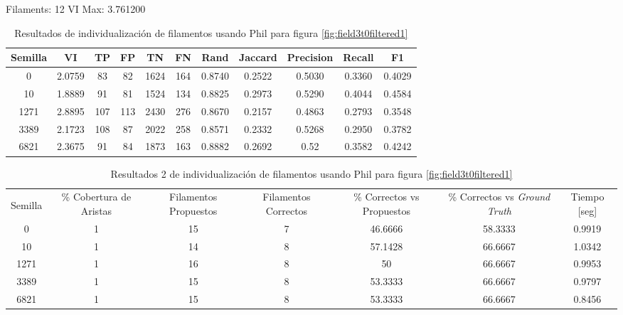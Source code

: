 Filaments: 12	VI Max: 3.761200
\begin{table}[h]
    \centering
    \begin{tabular}{|c|c|c|c|c|c|c|c|c|c|c|}
    \hline
        Semilla & VI & TP & FP &TN &FN & Rand	& Jaccard &	Precision &	Recall &	F1 \\ \hline 
        0    & 2.0759 & 83  & 82  & 1624 & 164 & 0.8740  & 0.2522  & 0.5030  & 0.3360 & 0.4029 \\
        10   & 1.8889  & 91  & 81  & 1524 & 134 & 0.8825 & 0.2973 & 0.5290  & 0.4044 & 0.4584 \\
        1271 & 2.8895 & 107 & 113 & 2430 & 276 & 0.8670 & 0.2157 & 0.4863 & 0.2793 & 0.3548\\
        3389 & 2.1723 & 108 & 87  & 2022 & 258 & 0.8571 & 0.2332 & 0.5268 & 0.2950 & 0.3782\\
        6821 & 2.3675 & 91  & 84  & 1873 & 163 & 0.8882 & 0.2692 & 0.52     & 0.3582 & 0.4242\\
        \hline
    \end{tabular}
    \caption{Resultados de individualizaci\'on de filamentos usando Phil para figura \ref{fig:field3t0filtered1}}
    \label{tab:field3t0filteredDetailedResults1}
\end{table}

\begin{table}[h]
    \centering
    \begin{tabular}{|c|c|c|c|c|c|c|}
    \hline
         & \multirow{4}{2cm}{\centering \% Cobertura de Aristas} & \multirow{4}{2cm}{Filamentos Propuestos} & \multirow{4}{2cm}{Filamentos Correctos} & \multirow{4}{2.5cm}{\% Correctos vs Propuestos} & \multirow{4}{2.5cm}{\centering \% Correctos vs {\it Ground Truth}} & \multirow{4}{1.2cm}{\centering Tiempo [seg]} \\
         &  &  &  & & &  \\
        Semilla &  &  &  & & &  \\
        &  &  &  & & &  \\ \hline 
        0 & 1 & 15 & 7 & 46.6666 & 58.3333 & 0.9919  \\
        10 & 1 & 14 & 8 & 57.1428 & 66.6667 & 1.0342\\
        1271 & 1 & 16 & 8 & 50  & 66.6667 & 0.9953\\
        3389 & 1 & 15 & 8 & 53.3333 & 66.6667 & 0.9797\\
        6821 & 1 & 15 & 8 & 53.3333 & 66.6667 & 0.8456\\
        \hline
    \end{tabular}
    \caption{Resultados 2 de individualizaci\'on de filamentos usando Phil para figura \ref{fig:field3t0filtered1}}
    \label{tab:field3t0filtered1DetailedResults2}
\end{table}

